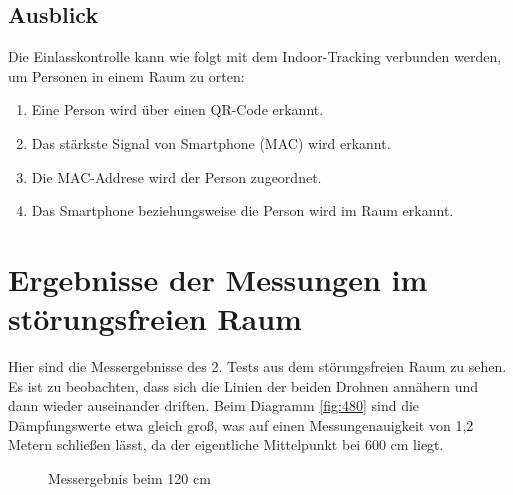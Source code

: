 \documentclass[a4paper]{spie}  %
\begin{document}
\subsection{Ausblick}
Die Einlasskontrolle kann wie folgt mit dem Indoor-Tracking verbunden werden, um Personen in einem Raum zu orten:
\begin{enumerate}
\item Eine Person wird über einen QR-Code erkannt.
\item Das stärkste Signal von Smartphone (MAC) wird erkannt.
\item Die MAC-Addrese wird der Person zugeordnet.
\item Das Smartphone beziehungsweise die Person wird im Raum erkannt.
\end{enumerate}

\section{Ergebnisse der Messungen im störungsfreien Raum}\label{testAnhang}
Hier sind die Messergebnisse des 2. Tests aus dem störungsfreien Raum zu sehen. Es ist zu beobachten, dass sich die Linien der beiden Drohnen annähern und dann wieder auseinander driften. Beim Diagramm \ref{fig:480} sind die Dämpfungswerte etwa gleich groß, was auf einen Messungenauigkeit von 1,2 Metern schließen lässt, da der eigentliche Mittelpunkt bei 600 cm liegt.

\begin{figure}[H]
	\centering
		\caption{Messergebnis beim 120 cm}
		\label{fig:120}
\end{figure}
\end{document}
